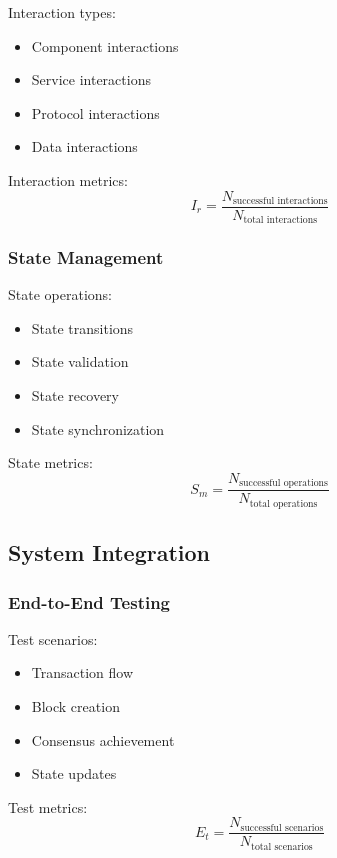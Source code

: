 \documentclass[12pt]{article}
\begin{document}
Interaction types:
\begin{itemize}
\item Component interactions
\item Service interactions
\item Protocol interactions
\item Data interactions
\end{itemize}

Interaction metrics:
\begin{equation}
I_r = \frac{N_{\text{successful interactions}}}{N_{\text{total interactions}}}
\end{equation}

\subsubsection{State Management}

State operations:
\begin{itemize}
\item State transitions
\item State validation
\item State recovery
\item State synchronization
\end{itemize}

State metrics:
\begin{equation}
S_m = \frac{N_{\text{successful operations}}}{N_{\text{total operations}}}
\end{equation}

\subsection{System Integration}

\subsubsection{End-to-End Testing}

Test scenarios:
\begin{itemize}
\item Transaction flow
\item Block creation
\item Consensus achievement
\item State updates
\end{itemize}

Test metrics:
\begin{equation}
E_t = \frac{N_{\text{successful scenarios}}}{N_{\text{total scenarios}}}
\end{equation}
\end{document}

